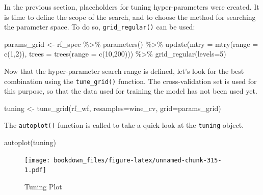 \documentclass[
]{krantz}
\makeatletter
\newenvironment{Shaded}{\begin{snugshade}}{\end{snugshade}}
\newcommand{\AttributeTok}[1]{\textcolor[rgb]{0.61,0.61,0.61}{#1}}
\newcommand{\DecValTok}[1]{\textcolor[rgb]{0.06,0.06,0.06}{#1}}
\newcommand{\FunctionTok}[1]{\textcolor[rgb]{0,0,0}{#1}}
\newcommand{\NormalTok}[1]{#1}
\newcommand{\OtherTok}[1]{\textcolor[rgb]{0.37,0.37,0.37}{#1}}
\newcommand{\SpecialCharTok}[1]{\textcolor[rgb]{0,0,0}{#1}}
\newenvironment{kframe}{%
\medskip{}
\setlength{\fboxsep}{.8em}
 \def\at@end@of@kframe{}%
 \ifinner\ifhmode%
  \def\at@end@of@kframe{\end{minipage}}%
  \begin{minipage}{\columnwidth}%
 \fi\fi%
 \def\FrameCommand##1{\hskip\@totalleftmargin \hskip-\fboxsep
 \colorbox{shadecolor}{##1}\hskip-\fboxsep
     \hskip-\linewidth \hskip-\@totalleftmargin \hskip\columnwidth}%
 \MakeFramed {\advance\hsize-\width
   \@totalleftmargin\z@ \linewidth\hsize
   \@setminipage}}%
 {\par\unskip\endMakeFramed%
 \at@end@of@kframe}
\renewenvironment{Shaded}{\begin{kframe}}{\end{kframe}}
\makeatother
\begin{document}
In the previous section, placeholders for tuning hyper-parameters were created. It is time to define the scope of the search, and to choose the method for searching the parameter space. To do so, \texttt{grid\_regular()} can be used:

\begin{Shaded}
\begin{Highlighting}[]
\NormalTok{params\_grid }\OtherTok{\textless{}{-}}\NormalTok{ rf\_spec }\SpecialCharTok{\%\textgreater{}\%}
  \FunctionTok{parameters}\NormalTok{() }\SpecialCharTok{\%\textgreater{}\%}
  \FunctionTok{update}\NormalTok{(}\AttributeTok{mtry =} \FunctionTok{mtry}\NormalTok{(}\AttributeTok{range =} \FunctionTok{c}\NormalTok{(}\DecValTok{1}\NormalTok{,}\DecValTok{2}\NormalTok{)),}
         \AttributeTok{trees =} \FunctionTok{trees}\NormalTok{(}\AttributeTok{range =} \FunctionTok{c}\NormalTok{(}\DecValTok{10}\NormalTok{,}\DecValTok{200}\NormalTok{))) }\SpecialCharTok{\%\textgreater{}\%} 
  \FunctionTok{grid\_regular}\NormalTok{(}\AttributeTok{levels=}\DecValTok{5}\NormalTok{)}
\end{Highlighting}
\end{Shaded}

Now that the hyper-parameter search range is defined, let's look for the best combination using the \texttt{tune\_grid()} function. The cross-validation set is used for this purpose, so that the data used for training the model has not been used yet.

\begin{Shaded}
\begin{Highlighting}[]
\NormalTok{tuning }\OtherTok{\textless{}{-}} \FunctionTok{tune\_grid}\NormalTok{(rf\_wf, }\AttributeTok{resamples=}\NormalTok{wine\_cv, }\AttributeTok{grid=}\NormalTok{params\_grid)}
\end{Highlighting}
\end{Shaded}

The \texttt{autoplot()} function is called to take a quick look at the \texttt{tuning} object.

\begin{Shaded}
\begin{Highlighting}[]
\FunctionTok{autoplot}\NormalTok{(tuning)}
\end{Highlighting}
\end{Shaded}

\begin{figure}
\centering
\texttt{[image: bookdown\_files/figure-latex/unnamed-chunk-315-1.pdf]}
\caption{\label{fig:unnamed-chunk-315}Tuning Plot}
\end{figure}
\end{document}
